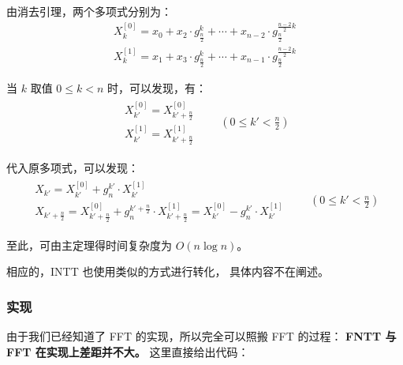 \documentclass[12pt, UTF8]{article}
\begin{document}
    由消去引理，两个多项式分别为：
    \begin{gather*}
        X_k^{[0]} = x_0 + x_2 · g_{\frac {n}{2}}^{k} + \cdots 
        + x_{n - 2} · g_{\frac {n}{2}}^{\frac {n - 2} {2} k}
        \\
        X_k^{[1]} = x_1 + x_3 · g_{\frac {n}{2}}^{k} + \cdots 
        + x_{n - 1} · g_{\frac {n}{2}}^{\frac {n - 2} {2} k}
    \end{gather*}

    当 $k$ 取值 $0 \le k < n$ 时，可以发现，有：
    \begin{gather*}
        \begin{matrix}
            X_{k'}^{[0]} = X_{k' + \frac {n} {2}}^{[0]}
            \\
            X_{k'}^{[1]} = X_{k' + \frac {n} {2}}^{[1]}
        \end{matrix}
        \qquad
        (0 \le k' < \frac {n} {2})
    \end{gather*}

    代入原多项式，可以发现：
    \begin{gather*}
        \begin{matrix}
            X_{k'} = X_{k'}^{[0]} + g_n^{k'} · X_{k'}^{[1]}
            \\
            X_{k' + \frac {n} {2}}
            = X_{k' + \frac {n} {2}}^{[0]} +
            g_n^{k' + \frac {n} {2}} · X_{k' + \frac {n} {2}}^{[1]}
            = X_{k'}^{[0]} - g_n^{k'} · X_{k'}^{[1]}
        \end{matrix}
        \qquad
        (0 \le k' < \frac {n} {2})
    \end{gather*}

    至此，可由主定理得时间复杂度为 $O(n \log n)$。

    \bigskip
    相应的，INTT 也使用类似的方式进行转化，
    具体内容不在阐述。

    \subsubsection{实现}
    由于我们已经知道了 FFT 的实现，所以完全可以照搬 FFT 的过程：
    \textbf{FNTT 与 FFT 在实现上差距并不大。}
    这里直接给出代码：
\end{document}
